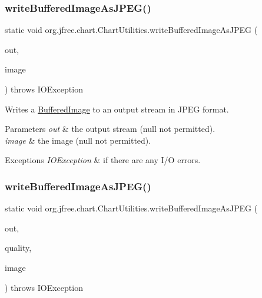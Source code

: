 \subsubsection{\texorpdfstring{write\+Buffered\+Image\+As\+J\+P\+E\+G()}{writeBufferedImageAsJPEG()}\hspace{0.1cm}{\footnotesize\ttfamily [1/2]}}
{\footnotesize\ttfamily static void org.\+jfree.\+chart.\+Chart\+Utilities.\+write\+Buffered\+Image\+As\+J\+P\+EG (\begin{DoxyParamCaption}\item[{Output\+Stream}]{out,  }\item[{Buffered\+Image}]{image }\end{DoxyParamCaption}) throws I\+O\+Exception\hspace{0.3cm}{\ttfamily [static]}}

Writes a \mbox{\hyperlink{}{Buffered\+Image}} to an output stream in J\+P\+EG format.


\begin{DoxyParams}{Parameters}
{\em out} & the output stream ({\ttfamily null} not permitted). \\
\hline
{\em image} & the image ({\ttfamily null} not permitted).\\
\hline
\end{DoxyParams}

\begin{DoxyExceptions}{Exceptions}
{\em I\+O\+Exception} & if there are any I/O errors. \\
\hline
\end{DoxyExceptions}
\mbox{\label{classorg_1_1jfree_1_1chart_1_1_chart_utilities_a225d7e9ec5bb810f415f1d92aec786c1}} 
\subsubsection{\texorpdfstring{write\+Buffered\+Image\+As\+J\+P\+E\+G()}{writeBufferedImageAsJPEG()}\hspace{0.1cm}{\footnotesize\ttfamily [2/2]}}
{\footnotesize\ttfamily static void org.\+jfree.\+chart.\+Chart\+Utilities.\+write\+Buffered\+Image\+As\+J\+P\+EG (\begin{DoxyParamCaption}\item[{Output\+Stream}]{out,  }\item[{float}]{quality,  }\item[{Buffered\+Image}]{image }\end{DoxyParamCaption}) throws I\+O\+Exception\hspace{0.3cm}{\ttfamily [static]}}

